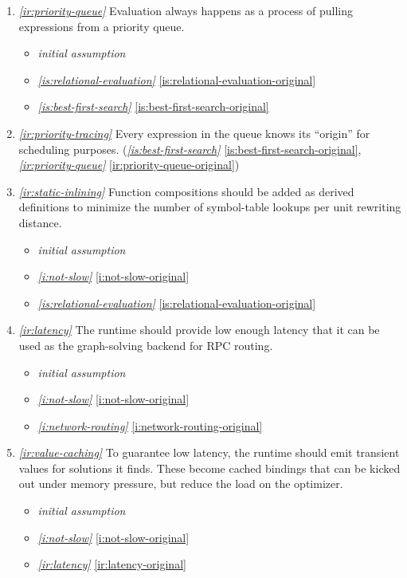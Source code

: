 \documentclass{report}
\makeatletter
\newcommand*{\Label}[2]{%
  \@bsphack
  \begingroup
    \label{#1-original}%
    \def\@currentlabel{#2}%
    \label{#1}%
  \endgroup
  \@esphack
}
\newcommand{\initial}{{\em initial assumption}}
\newcommand{\refboth}[1]{{\em \ref{#1}} \ref{#1-original}}
\makeatother
\begin{document}
\begin{enumerate}
\item{}\Label{ir:priority-queue}{xhr.priorityqueue}{\em\ref{ir:priority-queue}}
  Evaluation always happens as a process of pulling expressions from a
  priority queue.
\begin{itemize}
\item \initial
\item \refboth{is:relational-evaluation}
\item \refboth{is:best-first-search}
\end{itemize}
\item{}\Label{ir:priority-tracing}{xhr.prioritytracing}{\em\ref{ir:priority-tracing}}
  Every expression in the queue knows its ``origin'' for scheduling
  purposes.
(\refboth{is:best-first-search}, \refboth{ir:priority-queue})

\item{}\Label{ir:static-inlining}{xhr.staticinline}{\em\ref{ir:static-inlining}}
  Function compositions should be added as derived definitions to minimize
  the number of symbol-table lookups per unit rewriting distance.
\begin{itemize}
\item \initial
\item \refboth{i:not-slow}
\item \refboth{is:relational-evaluation}
\end{itemize}
\item{}\Label{ir:latency}{xhr.latency}{\em\ref{ir:latency}}
  The runtime should provide low enough latency that it can be used as the
  graph-solving backend for RPC routing.
\begin{itemize}
\item \initial
\item \refboth{i:not-slow}
\item \refboth{i:network-routing}
\end{itemize}
\item{}\Label{ir:value-caching}{xhr.valuecache}{\em\ref{ir:value-caching}}
  To guarantee low latency, the runtime should emit transient values for
  solutions it finds. These become cached bindings that can be kicked out
  under memory pressure, but reduce the load on the optimizer.
\begin{itemize}
\item \initial
\item \refboth{i:not-slow}
\item \refboth{ir:latency}
\end{itemize}


\end{enumerate}
\end{document}
